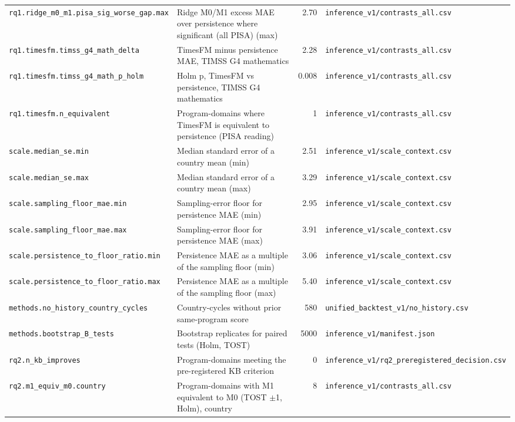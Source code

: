 {\begin{longtable}{p{4.6cm}p{5.6cm}rp{3.6cm}}
\texttt{rq1.ridge\_m0\_m1.pisa\_sig\_worse\_gap.max} & Ridge M0/M1 excess MAE over persistence where significant (all PISA) (max) & 2.70 & \texttt{inference\_v1/contrasts\_all.csv} \\
\texttt{rq1.timesfm.timss\_g4\_math\_delta} & TimesFM minus persistence MAE, TIMSS G4 mathematics & 2.28 & \texttt{inference\_v1/contrasts\_all.csv} \\
\texttt{rq1.timesfm.timss\_g4\_math\_p\_holm} & Holm p, TimesFM vs persistence, TIMSS G4 mathematics & 0.008 & \texttt{inference\_v1/contrasts\_all.csv} \\
\texttt{rq1.timesfm.n\_equivalent} & Program-domains where TimesFM is equivalent to persistence (PISA reading) & 1 & \texttt{inference\_v1/contrasts\_all.csv} \\
\texttt{scale.median\_se.min} & Median standard error of a country mean (min) & 2.51 & \texttt{inference\_v1/scale\_context.csv} \\
\texttt{scale.median\_se.max} & Median standard error of a country mean (max) & 3.29 & \texttt{inference\_v1/scale\_context.csv} \\
\texttt{scale.sampling\_floor\_mae.min} & Sampling-error floor for persistence MAE (min) & 2.95 & \texttt{inference\_v1/scale\_context.csv} \\
\texttt{scale.sampling\_floor\_mae.max} & Sampling-error floor for persistence MAE (max) & 3.91 & \texttt{inference\_v1/scale\_context.csv} \\
\texttt{scale.persistence\_to\_floor\_ratio.min} & Persistence MAE as a multiple of the sampling floor (min) & 3.06 & \texttt{inference\_v1/scale\_context.csv} \\
\texttt{scale.persistence\_to\_floor\_ratio.max} & Persistence MAE as a multiple of the sampling floor (max) & 5.40 & \texttt{inference\_v1/scale\_context.csv} \\
\texttt{methods.no\_history\_country\_cycles} & Country-cycles without prior same-program score & 580 & \texttt{unified\_backtest\_v1/no\_history.csv} \\
\texttt{methods.bootstrap\_B\_tests} & Bootstrap replicates for paired tests (Holm, TOST) & 5000 & \texttt{inference\_v1/manifest.json} \\
\texttt{rq2.n\_kb\_improves} & Program-domains meeting the pre-registered KB criterion & 0 & \texttt{inference\_v1/rq2\_preregistered\_decision.csv} \\
\texttt{rq2.m1\_equiv\_m0.country} & Program-domains with M1 equivalent to M0 (TOST $\pm$1, Holm), country & 8 & \texttt{inference\_v1/contrasts\_all.csv} \\

\end{longtable}}
